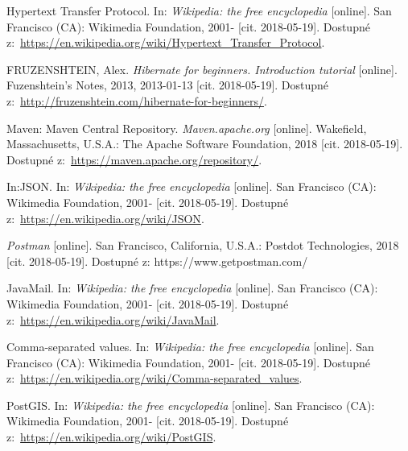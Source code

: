 \documentclass[a4paper,12pt]{article}
\begin{document}
{  Hypertext Transfer Protocol. In: \textit{Wikipedia: the free encyclopedia} [online]. San Francisco (CA): Wikimedia Foundation, 2001- [cit. 2018-05-19]. Dostupné z:~\url{https://en.wikipedia.org/wiki/Hypertext_Transfer_Protocol}.
  
  FRUZENSHTEIN, Alex. \textit{Hibernate for beginners. Introduction tutorial} [online]. Fuzenshtein's Notes, 2013, 2013-01-13 [cit. 2018-05-19]. Dostupné z:~\url{http://fruzenshtein.com/hibernate-for-beginners/}.
  
  Maven: Maven Central Repository. \textit{Maven.apache.org} [online]. Wakefield, Massachusetts, U.S.A.: The Apache Software Foundation, 2018 [cit. 2018-05-19]. Dostupné z:~\url{https://maven.apache.org/repository/}.
  
  In:JSON. In: \textit{Wikipedia: the free encyclopedia} [online]. San Francisco (CA): Wikimedia Foundation, 2001- [cit. 2018-05-19]. Dostupné z:~\url{https://en.wikipedia.org/wiki/JSON}.
  
  \textit{Postman} [online]. San Francisco, California, U.S.A.: Postdot Technologies, 2018 [cit. 2018-05-19]. Dostupné z: https://www.getpostman.com/
  
  JavaMail. In: \textit{Wikipedia: the free encyclopedia} [online]. San Francisco (CA): Wikimedia Foundation, 2001- [cit. 2018-05-19]. Dostupné z:~\url{https://en.wikipedia.org/wiki/JavaMail}.
  
  Comma-separated values. In: \textit{Wikipedia: the free encyclopedia} [online]. San Francisco (CA): Wikimedia Foundation, 2001- [cit. 2018-05-19]. Dostupné z:~\url{https://en.wikipedia.org/wiki/Comma-separated_values}.
  
  PostGIS. In: \textit{Wikipedia: the free encyclopedia} [online]. San Francisco (CA): Wikimedia Foundation, 2001- [cit. 2018-05-19]. Dostupné z:~\url{https://en.wikipedia.org/wiki/PostGIS}.
  
  
}



\end{document}
